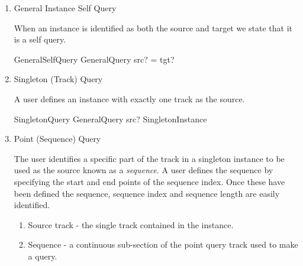 \documentclass[11pt]{article}
\begin{document}
\begin{enumerate}
\begin{schema}{GeneralQuery}
	SystemInstances \\
	src?, tgt? : Instance  \\
	sl?: \nat \\
	srcsearchvs!,   tgtsearchvs! :  \seq (\seq \Vdsl) \\  
	srcunitvs!,  tgtunitvs! :  \seq (\seq \Vsl) \\  
	sourcepowers, targetpowers : \seq (\seq \R) \\
	sourcedurations, targetdurations :  \seq (\seq \R) \\
\where
	\{ src?, tgt? \} \subseteq instances \\
\end{schema}
	
\item \textsf{General Instance Self Query}

When an instance is identified as both the source and target we state that it is a self query. 

\begin{schema}{GeneralSelfQuery}
	GeneralQuery
\where
	src? = tgt?
\end{schema}

\item Singleton  (Track)  Query

A user defines an instance with exactly one track as the source. 

\begin{schema}{SingletonQuery}
	GeneralQuery
\where
	src? \in SingletonInstance
\end{schema}
  
\item Point (Sequence) Query

The user identifies a specific part of the track in a singleton instance to be used as the source known as a \emph{sequence}.  A user defines the sequence by  specifying the start and end points of the sequence index. Once these have been defined the sequence, sequence index and sequence length are easily identified. 

\begin{enumerate}

\item \textsf{Source track} - the single track contained in the instance. 

\item \textsf{Sequence} - a continuous sub-section of the point query track used to make a	 query. 


\end{enumerate}
\end{enumerate}
\end{document}
